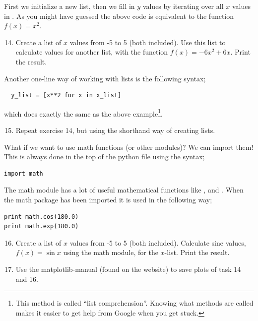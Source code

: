 \documentclass{article}
\begin{document}
First we initialize a new list,
then we fill in $y$ values by iterating over
all $x$ values in .
As you might have guessed the above code is equivalent to 
the function $f(x) = x^2$.\\

\begin{enumerate}
  \setcounter{enumi}{13}
  \item Create a list of $x$ values from -5 to 5 (both included). Use this list
    to calculate values for another list, with the function $f(x) = -6x^2 + 6x$.
    Print the result.

\end{enumerate}

Another one-line way of working with lists is the following syntax;

\begin{lstlisting}
  y_list = [x**2 for x in x_list]
\end{lstlisting}

which does exactly the same as the above example\footnote{This method is
called ``list comprehension''. Knowing what methods are called makes
it easier to get help from Google when you get stuck. }.

\begin{enumerate}
  \setcounter{enumi}{14}
  \item Repeat exercise 14, but using the shorthand way of creating lists.
\end{enumerate}

What if we want to use math functions (or other modules)?
We can import them! This is always done in the top of the
python file using the syntax;

\begin{lstlisting}
import math
\end{lstlisting}

The math module has a lot of useful mathematical functions like ,
 and . When the math package has been imported it is used
in the following way;

\begin{lstlisting}
print math.cos(180.0)
print math.exp(180.0)
\end{lstlisting}

\begin{enumerate}
  \setcounter{enumi}{15}
  \item Create a list of $x$ values from -5 to 5 (both included).
    Calculate sine values, $f(x) = \sin{x}$ using the math module,
    for the $x$-list.
    Print the result.
  \item Use the matplotlib-manual (found on the website) to save plots of 
    task 14 and 16.
\end{enumerate}
\end{document}
